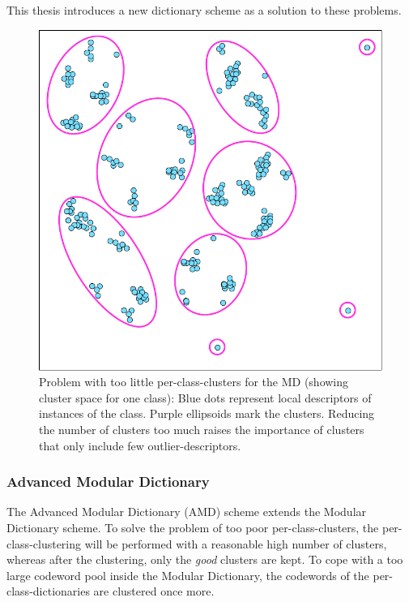 This thesis introduces a new dictionary scheme as a solution to these problems.

\begin{figure}[btph]
  \centering
        \includegraphics[width=.45\linewidth]{gfx/modular_dict_clusters}
        \caption{Problem with too little per-class-clusters for the MD (showing cluster space for one class): Blue dots represent local descriptors of instances of the class. Purple ellipsoids mark the clusters. Reducing the number of clusters too much raises the importance of clusters that only include few outlier-descriptors.}
        \label{fig:modularDictionaryClusters}
\end{figure}

\subsubsection{Advanced Modular Dictionary}
The Advanced Modular Dictionary (AMD) scheme extends the Modular Dictionary scheme. To solve the problem of too poor per-class-clusters, the per-class-clustering will be performed with a reasonable high number of clusters, whereas after the clustering, only the \emph{good} clusters are kept. To cope with a too large codeword pool inside the Modular Dictionary, the codewords of the per-class-dictionaries are clustered once more.

